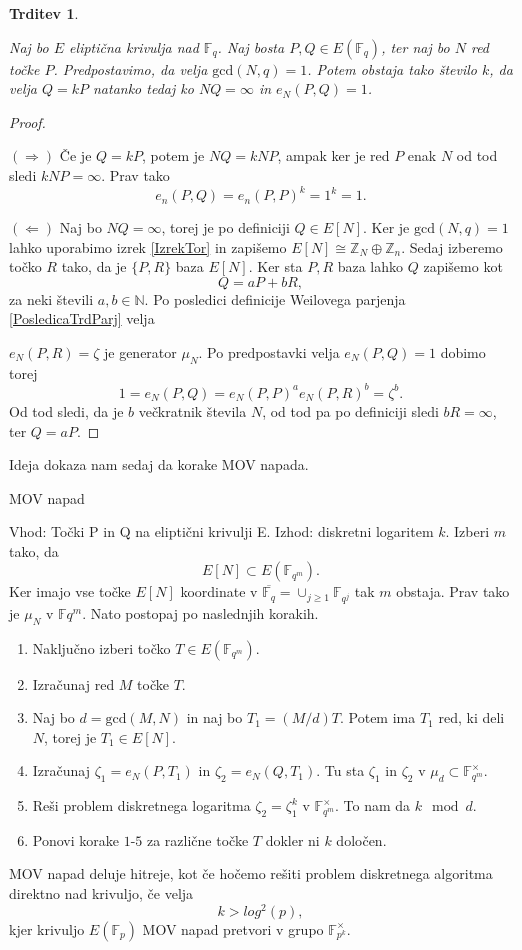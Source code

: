 \documentclass[12pt,a4paper,twoside]{article}
\theoremstyle{definition} %
\theoremstyle{plain} %
\newtheorem{trditev}[definicija]{Trditev}
\numberwithin{equation}{section}  %
\newcommand{\N}{\mathbb N}
\newcommand{\Z}{\mathbb Z}
\newcommand{\F}{\mathbb F}
\newcommand{\Fq}[1]{{\mathbb{F}_{#1}}}
\newcommand{\E}[1]{E({#1})}
\begin{document}
\begin{trditev}~

\label{trd:5.1}
Naj bo $E$ eliptična krivulja nad $\F_{q}$. Naj bosta $P,Q \in E(\F_{q})$, ter naj bo $N$ red točke $P$. Predpostavimo, da velja $\text{gcd}(N,q)=1$. Potem obstaja tako število $k$, da velja $Q = kP$ natanko tedaj ko $NQ = \infty$ in $e_N(P,Q)=1$.
\end{trditev}

\begin{proof}~

$(\Rightarrow)$ Če je $Q = kP$, potem je $NQ = kNP$, ampak ker je red $P$ enak $N$ od tod sledi $kNP = \infty$. Prav tako
$$e_n(P,Q) = e_n(P,P)^k = 1^k = 1.$$

$(\Leftarrow)$ Naj bo $NQ = \infty$, torej je po definiciji $Q \in E[N]$. Ker je $\text{gcd}(N,q) = 1$ lahko uporabimo izrek \ref{IzrekTor} in zapišemo 
$E[N] \cong \Z_N \oplus \Z_n$. Sedaj izberemo točko $R$ tako, da je $\{P,R \}$ baza $E[N]$. Ker sta $P,R$ baza  lahko $Q$ zapišemo kot
$$Q = aP+bR,$$
za neki števili $a,b \in \N$. Po posledici definicije Weilovega parjenja \ref{PosledicaTrdParj} velja 

\noindent $e_N(P,R)=\zeta$ je generator $\mu_N$.
Po predpostavki velja $e_N(P,Q) = 1$ dobimo torej
$$1 = e_N(P,Q) = e_N(P,P)^ae_N(P,R)^b = \zeta^b.$$
Od tod sledi, da je $b$ večkratnik števila $N$, od tod pa po definiciji sledi $bR = \infty$, ter $Q = aP$.
\end{proof}

Ideja dokaza nam sedaj da korake MOV napada.

\begin{algorithm}[H]
\caption[MOV]{MOV napad}
\label{alg:MOV}
Vhod: Točki P in Q na eliptični krivulji E.\newline
Izhod: diskretni logaritem $k$.\newline
Izberi $m$ tako, da $$E[N] \subset \E{\Fq{q^m}}.$$
Ker imajo vse točke $E[N]$ koordinate v $\overline{\Fq{q}} = \cup_{j\geq 1}\F_{q^j}$ tak $m$ obstaja. Prav tako je $\mu_N$ v $\F{q^m}$.
Nato postopaj po naslednjih korakih.
\begin{enumerate}
\item Naključno izberi točko $T \in \E{\Fq{q^m}}$.
\item Izračunaj red $M$ točke $T$.
\item Naj bo $d = \text{gcd}(M,N)$ in naj bo $T_1 = (M/d)T$. Potem ima $T_1$ red, ki deli $N$, torej je $T_1 \in E[N]$.
\item Izračunaj $\zeta_1 = e_N(P,T_1)$ in $\zeta_2 = e_N(Q,T_1)$. Tu sta $\zeta_1$ in $\zeta_2$ v $\mu_d \subset \F_{q^m}^\times$.
\item Reši problem diskretnega logaritma $\zeta_2 = \zeta_1^k$ v $\F_{q^m}^\times$. To nam da $k \mod d$.
\item Ponovi korake $1$-$5$ za različne točke $T$ dokler ni $k$ določen.
\end{enumerate}

\end{algorithm}
MOV napad deluje hitreje, kot če hočemo rešiti problem diskretnega algoritma direktno nad krivuljo, če velja 
$$k > log^2(p),$$
kjer krivuljo $E(\F_p)$ MOV napad pretvori v grupo $\F^{\times}_{p^k}$.
\end{document}
